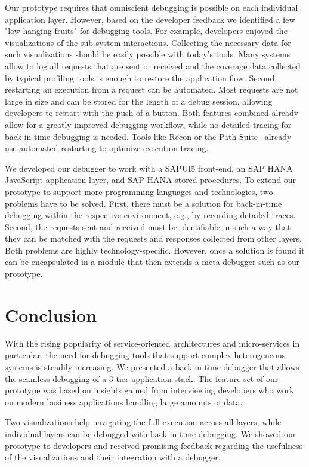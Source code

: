 \documentclass[
      english,
			conference,
      ]{IEEEtran}
\begin{document}
Our prototype requires that omniscient debugging is possible on each individual application layer.
However, based on the developer feedback we identified a few "low-hanging fruits" for debugging tools.
For example, developers enjoyed the visualizations of the sub-system interactions.
Collecting the necessary data for such visualizations should be easily possible with today's tools.
Many systems allow to log all requests that are sent or received and the coverage data collected by typical profiling tools is enough to restore the application flow.
Second, restarting an execution from a request can be automated.
Most requests are not large in size and can be stored for the length of a debug session, allowing developers to restart with the push of a button.
Both features combined already allow for a greatly improved debugging workflow, while no detailed tracing for back-in-time debugging is needed.
Tools like Recon or the Path Suite~\cite{lee_unified_2011, perscheid_testdriven_2013} already use automated restarting to optimize execution tracing.

We developed our debugger to work with a SAPUI5 front-end, an SAP HANA JavaScript application layer, and SAP HANA stored procedures.
To extend our prototype to support more programming languages and technologies, two problems have to be solved.
First, there must be a solution for back-in-time debugging within the respective environment, e.g., by recording detailed traces.
Second, the requests sent and received must be identifiable in such a way that they can be matched with the requests and responses collected from other layers.
Both problems are highly technology-specific. 
However, once a solution is found it can be encapsulated in a module that then extends a meta-debugger such as our prototype.

\section{Conclusion}
\label{sec:conclusion}

With the rising popularity of service-oriented architectures and micro-services in particular, the need for debugging tools that support complex heterogeneous systems is steadily increasing.
We presented a back-in-time debugger that allows the seamless debugging of a 3-tier application stack.
The feature set of our prototype was based on insights gained from interviewing developers who work on modern business applications handling large amounts of data.

Two visualizations help navigating the full execution across all layers, while individual layers can be debugged with back-in-time debugging.
We showed our prototype to developers and received promising feedback regarding the usefulness of the visualizations and their integration with a debugger.
\end{document}
